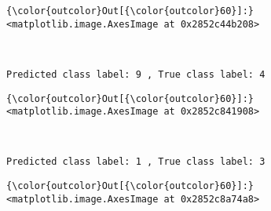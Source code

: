 \documentclass[11pt]{article}
\begin{document}
            \begin{Verbatim}[commandchars=\\\{\}]
{\color{outcolor}Out[{\color{outcolor}60}]:} <matplotlib.image.AxesImage at 0x2852c44b208>
\end{Verbatim}
        
    \begin{center}
    \end{center}
    { \hspace*{\fill} \\}
    
    \begin{Verbatim}[commandchars=\\\{\}]
Predicted class label: 9 , True class label: 4

    \end{Verbatim}

            \begin{Verbatim}[commandchars=\\\{\}]
{\color{outcolor}Out[{\color{outcolor}60}]:} <matplotlib.image.AxesImage at 0x2852c841908>
\end{Verbatim}
        
    \begin{center}
    \end{center}
    { \hspace*{\fill} \\}
    
    \begin{Verbatim}[commandchars=\\\{\}]
Predicted class label: 1 , True class label: 3

    \end{Verbatim}

            \begin{Verbatim}[commandchars=\\\{\}]
{\color{outcolor}Out[{\color{outcolor}60}]:} <matplotlib.image.AxesImage at 0x2852c8a74a8>
\end{Verbatim}
        
    \begin{center}
    \end{center}
    { \hspace*{\fill} \\}
    
\end{document}
